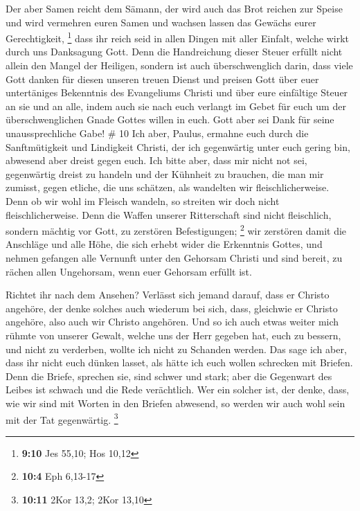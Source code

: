  Der aber Samen reicht dem Sämann, der wird auch das Brot
reichen zur Speise und wird vermehren euren Samen und wachsen lassen das
Gewächs eurer Gerechtigkeit, \footnote{\textbf{9:10} Jes 55,10; Hos
  10,12}  dass ihr reich seid in allen Dingen mit aller
Einfalt, welche wirkt durch uns Danksagung Gott.  Denn
die Handreichung dieser Steuer erfüllt nicht allein den Mangel der
Heiligen, sondern ist auch überschwenglich darin, dass viele Gott danken
für diesen unseren treuen Dienst  und preisen Gott über
euer untertäniges Bekenntnis des Evangeliums Christi und über eure
einfältige Steuer an sie und an alle,  indem auch sie
nach euch verlangt im Gebet für euch um der überschwenglichen Gnade
Gottes willen in euch.  Gott aber sei Dank für seine
unaussprechliche Gabe! \# 10  Ich aber, Paulus, ermahne
euch durch die Sanftmütigkeit und Lindigkeit Christi, der ich
gegenwärtig unter euch gering bin, abwesend aber dreist gegen euch.
 Ich bitte aber, dass mir nicht not sei, gegenwärtig
dreist zu handeln und der Kühnheit zu brauchen, die man mir zumisst,
gegen etliche, die uns schätzen, als wandelten wir fleischlicherweise.
 Denn ob wir wohl im Fleisch wandeln, so streiten wir doch
nicht fleischlicherweise.  Denn die Waffen unserer
Ritterschaft sind nicht fleischlich, sondern mächtig vor Gott, zu
zerstören Befestigungen; \footnote{\textbf{10:4} Eph 6,13-17}
 wir zerstören damit die Anschläge und alle Höhe, die sich
erhebt wider die Erkenntnis Gottes, und nehmen gefangen alle Vernunft
unter den Gehorsam Christi  und sind bereit, zu rächen
allen Ungehorsam, wenn euer Gehorsam erfüllt ist.

 Richtet ihr nach dem Ansehen? Verlässt sich jemand
darauf, dass er Christo angehöre, der denke solches auch wiederum bei
sich, dass, gleichwie er Christo angehöre, also auch wir Christo
angehören.  Und so ich auch etwas weiter mich rühmte von
unserer Gewalt, welche uns der Herr gegeben hat, euch zu bessern, und
nicht zu verderben, wollte ich nicht zu Schanden werden. 
Das sage ich aber, dass ihr nicht euch dünken lasset, als hätte ich euch
wollen schrecken mit Briefen.  Denn die Briefe, sprechen
sie, sind schwer und stark; aber die Gegenwart des Leibes ist schwach
und die Rede verächtlich.  Wer ein solcher ist, der
denke, dass, wie wir sind mit Worten in den Briefen abwesend, so werden
wir auch wohl sein mit der Tat gegenwärtig. \footnote{\textbf{10:11}
  2Kor 13,2; 2Kor 13,10}

